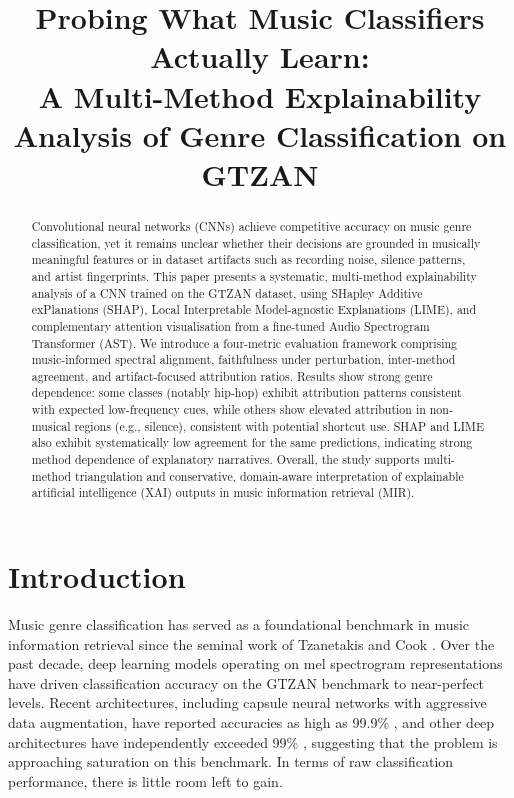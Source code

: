 \documentclass{article}
\title{Probing What Music Classifiers Actually Learn:\\ A Multi-Method Explainability Analysis of Genre Classification on GTZAN}
\begin{document}
\maketitle

\begin{abstract}
Convolutional neural networks (CNNs) achieve competitive accuracy on music genre classification, yet it remains unclear whether their decisions are grounded in musically meaningful features or in dataset artifacts such as recording noise, silence patterns, and artist fingerprints. This paper presents a systematic, multi-method explainability analysis of a CNN trained on the GTZAN dataset, using SHapley Additive exPlanations (SHAP), Local Interpretable Model-agnostic Explanations (LIME), and complementary attention visualisation from a fine-tuned Audio Spectrogram Transformer (AST). We introduce a four-metric evaluation framework comprising music-informed spectral alignment, faithfulness under perturbation, inter-method agreement, and artifact-focused attribution ratios. Results show strong genre dependence: some classes (notably hip-hop) exhibit attribution patterns consistent with expected low-frequency cues, while others show elevated attribution in non-musical regions (e.g., silence), consistent with potential shortcut use. SHAP and LIME also exhibit systematically low agreement for the same predictions, indicating strong method dependence of explanatory narratives. Overall, the study supports multi-method triangulation and conservative, domain-aware interpretation of explainable artificial intelligence (XAI) outputs in music information retrieval (MIR).
\end{abstract}

\section{Introduction}\label{sec:introduction}

Music genre classification has served as a foundational benchmark in music information retrieval since the seminal work of Tzanetakis and Cook \cite{Tzanetakis2002}. Over the past decade, deep learning models operating on mel spectrogram representations have driven classification accuracy on the GTZAN benchmark to near-perfect levels. Recent architectures, including capsule neural networks with aggressive data augmentation, have reported accuracies as high as 99.9\% \cite{Lim2025}, and other deep architectures have independently exceeded 99\% \cite{Nanni2023}, suggesting that the problem is approaching saturation on this benchmark. In terms of raw classification performance, there is little room left to gain.
\end{document}

